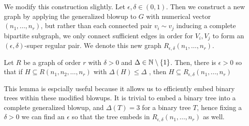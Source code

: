 We modify this construction slightly. Let \(\epsilon, \delta \in \left( 0, 1 \right) \). Then we construct a new graph by applying the generalized blowup to \(G\) with numerical vector \((n_1, \ldots, n_{r})\), but rather than each connected pair \(v_{i} \sim v_{j}\) inducing a complete bipartite subgraph, we only connect sufficient edges in order for \(V_{i}, V_{j}\) to form an \(\left( \epsilon, \delta \right) \)-super regular pair. We denote this new graph \(R_{\epsilon, \delta}\left( n_1, \ldots, n_{r} \right) \).
\begin{theorem}
	Let \(R\) be a graph of order \(r\) with \(\delta > 0\) and \(\Delta \in \mathbb{N} \setminus \{1\} \). Then, there is \(\epsilon > 0\) so that if \(H \subseteq R\left( n_1, n_2, \ldots, n_{r} \right) \) with \(\Delta\left( H \right) \le \Delta\) , then \(H \subseteq R_{\epsilon, \delta}\left( n_1, \ldots, n_{r}\right) \)
\end{theorem}
This lemma is espcially useful because it allows us to efficiently embed binary trees within these modified blowups. It is trivial to embed a binary tree into a complete generalized blowup, and \(\Delta\left( T \right) = 3\) for a binary tree \(T\), hence fixing a \(\delta > 0\) we can find an \(\epsilon\) so that the tree embeds in \(R_{\epsilon, \delta}\left( n_1, \ldots, n_{r} \right) \) as well.
